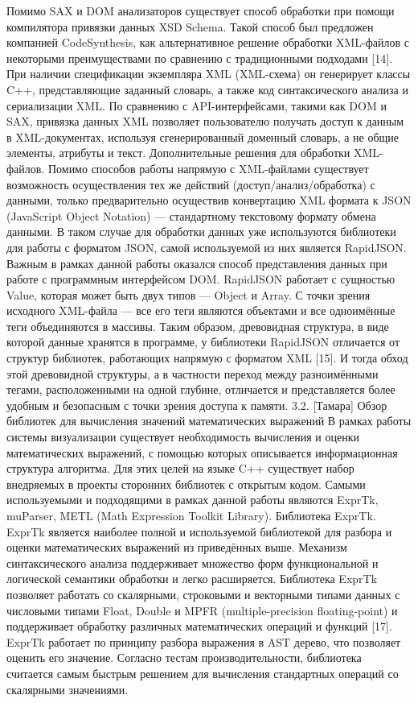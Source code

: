 Помимо SAX и DOM анализаторов существует способ обработки при помощи компилятора привязки данных XSD Schema. Такой способ был предложен компанией CodeSynthesis, как альтернативное решение обработки XML-файлов с некоторыми преимуществами по сравнению с традиционными подходами [14]. При наличии спецификации экземпляра XML (XML-схема) он генерирует классы C++, представляющие заданный словарь, а также код синтаксического анализа и сериализации XML. По сравнению с API-интерфейсами, такими как DOM и SAX, привязка данных XML позволяет пользователю получать доступ к данным в XML-документах, используя сгенерированный доменный словарь, а не общие элементы, атрибуты и текст.
Дополнительные решения для обработки XML-файлов.
Помимо способов работы напрямую с XML-файлами существует возможность осуществления тех же действий (доступ/анализ/обработка) с данными, только предварительно осуществив конвертацию XML формата к JSON (JavaScript Object Notation) — стандартному текстовому формату обмена данными. В таком случае для обработки данных уже используются библиотеки для работы с форматом JSON, самой используемой из них является RapidJSON.
Важным в рамках данной работы оказался способ представления данных при работе с программным интерфейсом DOM. RapidJSON работает с сущностью Value, которая может быть двух типов — Object и Array. С точки зрения исходного XML-файла — все его теги являются объектами и все одноимённые теги объединяются в массивы. Таким образом, древовидная структура, в виде которой данные хранятся в программе, у библиотеки RapidJSON отличается от структур библиотек, работающих напрямую с форматом XML [15]. И тогда обход этой древовидной структуры, а в частности переход между разноимёнными тегами, расположенными на одной глубине, отличается и представляется более удобным и безопасным с точки зрения доступа к памяти.
3.2. [Тамара] Обзор библиотек для вычисления значений математических выражений
В рамках работы системы визуализации существует необходимость вычисления и оценки математических выражений, с помощью которых описывается информационная структура алгоритма. Для этих целей на языке C++ существует набор внедряемых в проекты сторонних библиотек с открытым кодом. Самыми используемыми и подходящими в рамках данной работы являются ExprTk, muParser, METL (Math Expression Toolkit Library).
Библиотека ExprTk.
ExprTk является наиболее полной и используемой библиотекой для разбора и оценки математических выражений из приведённых выше. Механизм синтаксического анализа поддерживает множество форм функциональной и логической семантики обработки и легко расширяется. Библиотека ExprTk позволяет работать со скалярными, строковыми и векторными типами  данных с числовыми типами Float, Double и MPFR (multiple-precision floating-point) и поддерживает обработку различных математических операций и функций [17]. ExprTk работает по принципу разбора выражения в AST дерево, что позволяет оценить его значение. Согласно тестам производительности, библиотека считается самым быстрым решением для вычисления стандартных операций со скалярными значениями.

